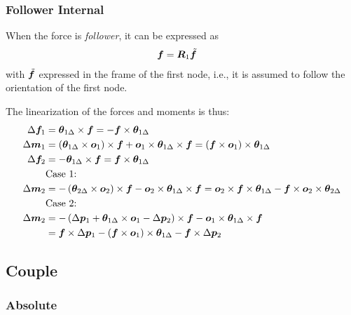 \subsubsection{Follower Internal}
When the force is \emph{follower}, it can be expressed as 
\begin{align}
	\bm{f} &= \bm{R}_1 \tilde{\bm{f}}
\end{align}
with $\tilde{\bm{f}}$ expressed in the frame of the first node, i.e., it is assumed to follow the orientation of the first node.

The linearization of the forces and moments is thus:
\begin{subequations}
\begin{align}
	\Delta\bm{f}_1
	&=
	\bm{\theta}_{1\Delta} \times \bm{f}
	=
	- \bm{f} \times \bm{\theta}_{1\Delta}
	\\
	\Delta\bm{m}_1
	&=
	\left( \bm{\theta}_{1\Delta} \times \bm{o}_1 \right) \times \bm{f} + \bm{o}_1 \times \bm{\theta}_{1\Delta} \times \bm{f}
	=
	\left( \bm{f} \times \bm{o}_1 \right) \times \bm{\theta}_{1\Delta}
	\\
	\Delta\bm{f}_2
	&=
	- \bm{\theta}_{1\Delta} \times \bm{f}
	=
	\bm{f} \times \bm{\theta}_{1\Delta}
	\\
	&\text{Case 1:} \nonumber \\
	\Delta\bm{m}_2
	&=
	- \left( \bm{\theta}_{2\Delta} \times \bm{o}_2 \right) \times \bm{f} - \bm{o}_2 \times \bm{\theta}_{1\Delta} \times \bm{f}
	=
	\bm{o}_2 \times \bm{f} \times \bm{\theta}_{1\Delta} - \bm{f} \times \bm{o}_2 \times \bm{\theta}_{2\Delta}
	\\
	&\text{Case 2:} \nonumber \\
	\Delta\bm{m}_2
	&=
	- \left( \Delta\bm{p}_1 + \bm{\theta}_{1\Delta} \times \bm{o}_1 - \Delta\bm{p}_2 \right) \times \bm{f} - \bm{o}_1 \times \bm{\theta}_{1\Delta} \times \bm{f}
	\nonumber \\ &
	=
	\bm{f} \times \Delta\bm{p}_1 - \left( \bm{f} \times \bm{o}_1 \right) \times \bm{\theta}_{1\Delta} - \bm{f} \times \Delta\bm{p}_2
\end{align}
\end{subequations}

\subsection{Couple}

\subsubsection{Absolute}

